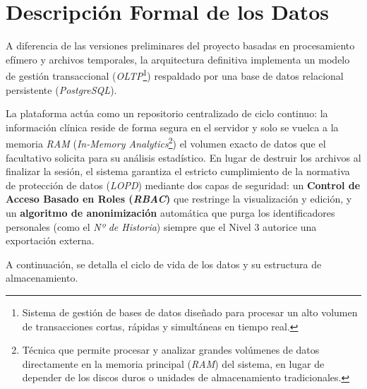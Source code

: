 \section{Descripción Formal de los Datos}
A diferencia de las versiones preliminares del proyecto basadas en procesamiento efímero y archivos temporales, la arquitectura definitiva implementa un modelo de gestión transaccional (\textit{OLTP}\footnote{Sistema de gestión de bases de datos diseñado para procesar un alto volumen de transacciones cortas, rápidas y simultáneas en tiempo real.}) respaldado por una base de datos relacional persistente (\textit{PostgreSQL}). 

La plataforma actúa como un repositorio centralizado de ciclo continuo: la información clínica reside de forma segura en el servidor y solo se vuelca a la memoria \textit{RAM} (\textit{In-Memory Analytics}\footnote{Técnica que permite procesar y analizar grandes volúmenes de datos directamente en la memoria principal (\textit{RAM}) del sistema, en lugar de depender de los discos duros o unidades de almacenamiento tradicionales.}) el volumen exacto de datos que el facultativo solicita para su análisis estadístico. En lugar de destruir los archivos al finalizar la sesión, el sistema garantiza el estricto cumplimiento de la normativa de protección de datos (\textit{LOPD}) mediante dos capas de seguridad: un \textbf{Control de Acceso Basado en Roles (\textit{RBAC})} que restringe la visualización y edición, y un \textbf{algoritmo de anonimización} automática que purga los identificadores personales (como el \textit{Nº de Historia}) siempre que el Nivel 3 autorice una exportación externa.

A continuación, se detalla el ciclo de vida de los datos y su estructura de almacenamiento.

